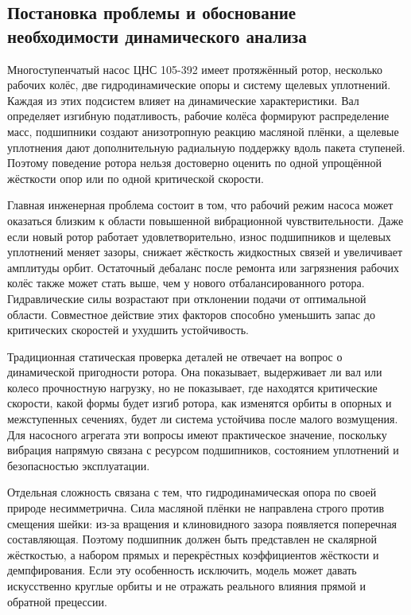 \subsection{Постановка проблемы и обоснование необходимости динамического анализа}

Многоступенчатый насос ЦНС 105-392 имеет протяжённый ротор, несколько рабочих колёс, две гидродинамические опоры и систему щелевых уплотнений. Каждая из этих подсистем влияет на динамические характеристики. Вал определяет изгибную податливость, рабочие колёса формируют распределение масс, подшипники создают анизотропную реакцию масляной плёнки, а щелевые уплотнения дают дополнительную радиальную поддержку вдоль пакета ступеней. Поэтому поведение ротора нельзя достоверно оценить по одной упрощённой жёсткости опор или по одной критической скорости.

Главная инженерная проблема состоит в том, что рабочий режим насоса может оказаться близким к области повышенной вибрационной чувствительности. Даже если новый ротор работает удовлетворительно, износ подшипников и щелевых уплотнений меняет зазоры, снижает жёсткость жидкостных связей и увеличивает амплитуды орбит. Остаточный дебаланс после ремонта или загрязнения рабочих колёс также может стать выше, чем у нового отбалансированного ротора. Гидравлические силы возрастают при отклонении подачи от оптимальной области. Совместное действие этих факторов способно уменьшить запас до критических скоростей и ухудшить устойчивость.

Традиционная статическая проверка деталей не отвечает на вопрос о динамической пригодности ротора. Она показывает, выдерживает ли вал или колесо прочностную нагрузку, но не показывает, где находятся критические скорости, какой формы будет изгиб ротора, как изменятся орбиты в опорных и межступенных сечениях, будет ли система устойчива после малого возмущения. Для насосного агрегата эти вопросы имеют практическое значение, поскольку вибрация напрямую связана с ресурсом подшипников, состоянием уплотнений и безопасностью эксплуатации.

Отдельная сложность связана с тем, что гидродинамическая опора по своей природе несимметрична. Сила масляной плёнки не направлена строго против смещения шейки: из-за вращения и клиновидного зазора появляется поперечная составляющая. Поэтому подшипник должен быть представлен не скалярной жёсткостью, а набором прямых и перекрёстных коэффициентов жёсткости и демпфирования. Если эту особенность исключить, модель может давать искусственно круглые орбиты и не отражать реального влияния прямой и обратной прецессии.

